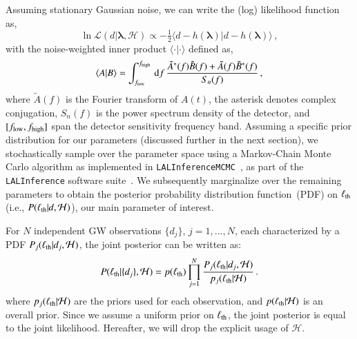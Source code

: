 \documentclass[twocolumn,
               prd,
               aps,
               superscriptaddress,
               tightenlines,
               nofootinbib,
               eqsecnum,
               amsfonts,
               amsmath,
               longbibliography]{revtex4-1}
\newcommand{\dd}{{\rm d}}
\begin{document}
Assuming stationary Gaussian noise, we can write the (log) likelihood function as,
%
\begin{equation}
\ln \mathcal{L}(d \vert \bm{\lambda},\mathcal{H}) \propto
- \tfrac{1}{2}
\langle
d - h(\bm{\lambda}) \vert d - h(\bm{\lambda})
\rangle\,,
\end{equation}
%
with the noise-weighted inner product $\langle \cdot | \cdot \rangle$ defined as,
%
\begin{equation}
\langle A | B \rangle =
\int_{f_{\rm low}}^{f_{\rm high}} \, \dd f \,
\frac{\tilde{A}^{\ast}(f) \tilde{B}(f) + \tilde{A}(f) \tilde{B}^{\ast}(f)}{S_{n}(f)}\,,
\end{equation}
%
where $\tilde{A}(f)$ is the Fourier transform of $A(t)$, the asterisk denotes
complex conjugation, $S_{n}(f)$ is the power spectrum density of the
detector, and $[f_{\rm low}, f_{\rm high}]$ span the detector sensitivity frequency band.
%
Assuming a specific prior distribution for our parameters (discussed further in the next section), we stochastically
sample over the parameter space using a Markov-Chain Monte Carlo algorithm as implemented in
\texttt{LALInferenceMCMC}~\cite{Rover:2006ni,vanderSluys:2008qx}, as part of the \texttt{LALInference} software suite~\cite{Veitch:2014wba,lalsuite}.
%
We subsequently marginalize over the remaining parameters to obtain the
posterior probability distribution function~(PDF) on $\ell_{\rm th}$ (i.e., $P(\ell_{\rm th} \vert d,\mathcal{H})$),
our main parameter of interest.

For $N$ independent GW observations $\{d_j\}$, $j=1,...,N$, each characterized
by a PDF $P_j(\ell_{\rm th} \vert d_j,\mathcal{H})$, the
joint posterior can be written as:
%
\begin{equation}
P(\ell_{\rm th} | \{d_j\},\mathcal{H}) = p(\ell_{\rm th}) \prod_{j=1}^{N} \frac{P_j(\ell_{\rm th} | d_j,\mathcal{H})}{p_j(\ell_{\rm th}|\mathcal{H})}\,.
\label{eq:cumulative_dist_ell}
\end{equation}
%
where $p_j(\ell_{\rm th} | \mathcal{H})$ are the priors used for each observation, and $p(\ell_{\rm th} | \mathcal{H})$ is an overall prior.
%
Since we assume a uniform prior on $\ell_{\rm th}$, the joint posterior is
equal to the joint likelihood. Hereafter, we will drop the explicit usage of
$\mathcal{H}$.
%
%
\end{document}
